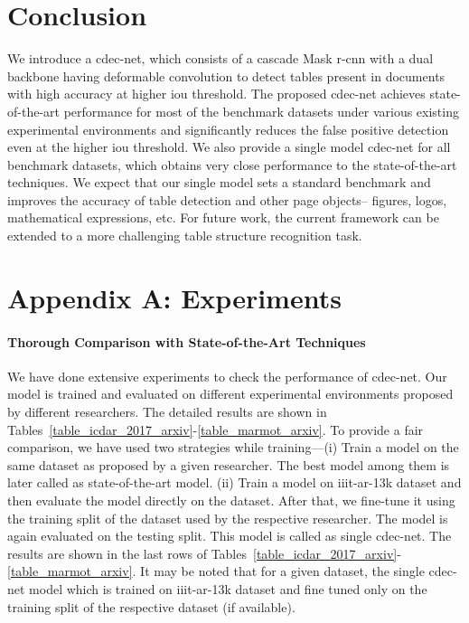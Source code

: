\documentclass[a4paper,conference]{IEEEtran}
\begin{document}
\section{Conclusion} \label{conclusion}

We introduce a {\sc cd}e{\sc c}-{\sc n}et, which consists of a cascade Mask {\sc r-cnn} with a dual backbone having deformable convolution to detect tables present in documents with high accuracy at higher {\sc i}o{\sc u} threshold. The proposed {\sc cd}e{\sc c-n}et achieves state-of-the-art performance for most of the benchmark datasets under various existing experimental environments and significantly reduces the false positive detection even at the higher {\sc i}o{\sc u} threshold. We also provide a single model {\sc cd}e{\sc c}-{\sc n}et for all benchmark datasets, which obtains very close performance to the state-of-the-art techniques. We expect that our single model sets a standard benchmark and improves the accuracy of table detection and other page objects-- figures, logos, mathematical expressions, etc. For future work, the current framework can be extended to a more challenging table structure recognition task. 




\section*{Appendix A: Experiments}

\paragraph*{\textbf{Thorough Comparison with State-of-the-Art Techniques}}

We have done extensive experiments to check the performance of {\sc cd}e{\sc c-n}et. Our model is trained and evaluated on different experimental environments proposed by different researchers. The detailed results are shown in Tables~\ref{table_icdar_2017_arxiv}-\ref{table_marmot_arxiv}. To provide a fair comparison, we have used two strategies while training---(i) Train a model on the same dataset as proposed by a given researcher. The best model among them is later called as state-of-the-art model. (ii) Train a model on {\sc iiit-ar-13k} dataset and then evaluate the model directly on the dataset. After that, we fine-tune it using the training split of the dataset used by the respective researcher. The model is again evaluated on the testing split. This model is called as single {\sc cd}e{\sc c-n}et. The results are shown in the last rows of Tables~\ref{table_icdar_2017_arxiv}-\ref{table_marmot_arxiv}. It may be noted that for a given dataset, the single {\sc cd}e{\sc c-n}et model which is trained on {\sc iiit-ar-13k} dataset and fine tuned only on the training split of the respective dataset (if available). 
\end{document}
